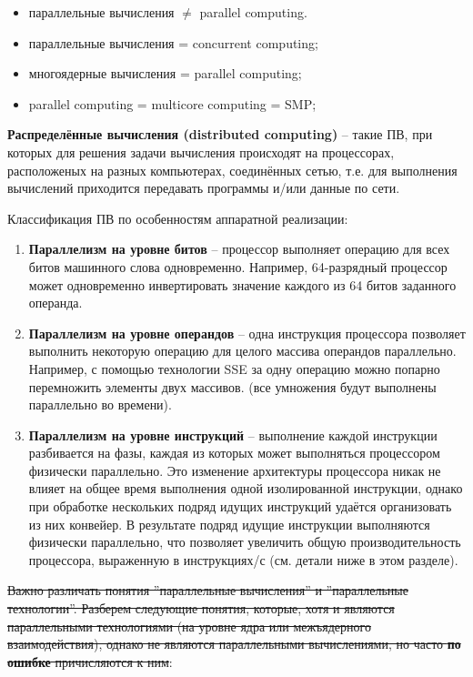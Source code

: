 {		\begin{itemize}
			\item параллельные вычисления $\neq$ parallel computing.			
			\item параллельные вычисления = concurrent computing;
			\item многоядерные вычисления = parallel computing;
			\item parallel computing = multicore computing = SMP;
		\end{itemize}
	\par\textbf{Распределённые вычисления (distributed computing)} -- такие ПВ, при которых для решения задачи вычисления происходят на процессорах, расположеных на разных компьютерах, соединённых сетью, т.е. для выполнения вычислений приходится передавать программы и/или данные по сети.
	\par Классификация ПВ по особенностям аппаратной реализации:
		\begin{enumerate}
			\item\textbf{Параллелизм на уровне битов} -- процессор выполняет операцию для всех битов машинного слова одновременно. Например, 64-разрядный процессор может одновременно инвертировать значение каждого из 64 битов заданного операнда.
			\item\textbf{Параллелизм на уровне операндов} -- одна инструкция процессора позволяет выполнить некоторую операцию для целого массива операндов параллельно. Например, с помощью технологии SSE за одну операцию можно попарно перемножить элементы двух массивов. (все умножения будут выполнены параллельно во времени). 
			\item\textbf{Параллелизм на уровне инструкций} -- выполнение каждой инструкции разбивается на фазы, каждая из которых может выполняться процессором физически параллельно. Это изменение архитектуры процессора никак не влияет на общее время выполнения одной изолированной инструкции, однако при обработке нескольких подряд идущих инструкций удаётся организовать из них конвейер. В результате подряд идущие инструкции выполняются физически параллельно, что позволяет увеличить общую производительность процессора, выраженную в инструкциях/с (см. детали ниже в этом разделе).
		\end{enumerate}
	\par\sout{Важно различать понятия ''параллельные вычисления'' и ''параллельные технологии''. Разберем следующие понятия, которые, хотя и являются параллельными технологиями (на уровне ядра или межъядерного взаимодействия), однако не являются параллельными вычислениями, но часто \textbf{по ошибке} причисляются к ним}:
}
